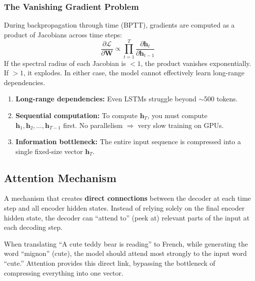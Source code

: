 \documentclass[11pt, a4paper]{article}
\begin{document}
\subsubsection{The Vanishing Gradient Problem}

\begin{defbox}
During backpropagation through time (BPTT), gradients are computed as a product of Jacobians across time steps:
\[
\frac{\partial \mathcal{L}}{\partial \mathbf{W}} \propto \prod_{t=1}^{T} \frac{\partial \mathbf{h}_t}{\partial \mathbf{h}_{t-1}}
\]
If the spectral radius of each Jacobian is $<1$, the product vanishes exponentially. If $>1$, it explodes. In either case, the model cannot effectively learn long-range dependencies.
\end{defbox}

\begin{warnbox}
\begin{enumerate}[leftmargin=1.5em]
  \item \textbf{Long-range dependencies:} Even LSTMs struggle beyond $\sim$500 tokens.
  \item \textbf{Sequential computation:} To compute $\mathbf{h}_T$, you must compute $\mathbf{h}_1, \mathbf{h}_2, \ldots, \mathbf{h}_{T-1}$ first. No parallelism $\Rightarrow$ very slow training on GPUs.
  \item \textbf{Information bottleneck:} The entire input sequence is compressed into a single fixed-size vector $\mathbf{h}_T$.
\end{enumerate}
\end{warnbox}

\subsection{Attention Mechanism}

\begin{defbox}
A mechanism that creates \textbf{direct connections} between the decoder at each time step and all encoder hidden states. Instead of relying solely on the final encoder hidden state, the decoder can ``attend to'' (peek at) relevant parts of the input at each decoding step.
\end{defbox}

\begin{exbox}
When translating ``A cute teddy bear is reading'' to French, while generating the word ``mignon'' (cute), the model should attend most strongly to the input word ``cute.'' Attention provides this direct link, bypassing the bottleneck of compressing everything into one vector.
\end{exbox}
\end{document}
